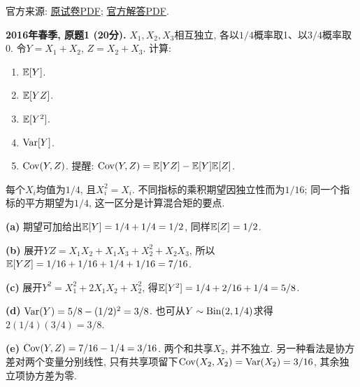 \noindent 官方来源: \href{https://ocw.mit.edu/courses/18-600-probability-and-random-variables-fall-2019/b146bf10509052fa0881160aaa603aea_MIT18_600F19_mid1_2016.pdf}{原试卷PDF}; \href{https://ocw.mit.edu/courses/18-600-probability-and-random-variables-fall-2019/b744aee08a1ab02c622fc9916e4c7467_MIT18_600F19_mid1_2016_soln.pdf}{官方解答PDF}.
\begin{exercise}\label{ex:m1-2016s-q1}
\textbf{2016年春季, 原题1 (20分).} $X_1,X_2,X_3$相互独立, 各以$1/4$概率取1、以$3/4$概率取0. 令$Y=X_1+X_2$, $Z=X_2+X_3$. 计算:
\begin{enumerate}\item[(a)]\label{ex:m1-2016s-q1-a} $\mathbb E[Y]$.\item[(b)]\label{ex:m1-2016s-q1-b} $\mathbb E[YZ]$.\item[(c)]\label{ex:m1-2016s-q1-c} $\mathbb E[Y^2]$.\item[(d)]\label{ex:m1-2016s-q1-d} $\operatorname{Var}[Y]$.\item[(e)]\label{ex:m1-2016s-q1-e} $\operatorname{Cov}(Y,Z)$. 提醒: $\operatorname{Cov}(Y,Z)=\mathbb E[YZ]-\mathbb E[Y]\mathbb E[Z]$.\end{enumerate}
\end{exercise}
\begin{solution}
每个$X_i$均值为$1/4$, 且$X_i^2=X_i$. 不同指标的乘积期望因独立性而为$1/16$; 同一个指标的平方期望为$1/4$, 这一区分是计算混合矩的要点.

\textbf{(a)}\label{sol:m1-2016s-q1-a} 期望可加给出$\mathbb E[Y]=1/4+1/4=1/2$, 同样$\mathbb E[Z]=1/2$.

\textbf{(b)}\label{sol:m1-2016s-q1-b} 展开$YZ=X_1X_2+X_1X_3+X_2^2+X_2X_3$, 所以$\mathbb E[YZ]=1/16+1/16+1/4+1/16=7/16$.

\textbf{(c)}\label{sol:m1-2016s-q1-c} 展开$Y^2=X_1^2+2X_1X_2+X_2^2$, 得$\mathbb E[Y^2]=1/4+2/16+1/4=5/8$.

\textbf{(d)}\label{sol:m1-2016s-q1-d} $\operatorname{Var}(Y)=5/8-(1/2)^2=3/8$. 也可从$Y\sim\operatorname{Bin}(2,1/4)$求得$2(1/4)(3/4)=3/8$.

\textbf{(e)}\label{sol:m1-2016s-q1-e} $\operatorname{Cov}(Y,Z)=7/16-1/4=3/16$. 两个和共享$X_2$, 并不独立. 另一种看法是协方差对两个变量分别线性, 只有共享项留下$\operatorname{Cov}(X_2,X_2)=\operatorname{Var}(X_2)=3/16$, 其余独立项协方差为零.
\end{solution}

